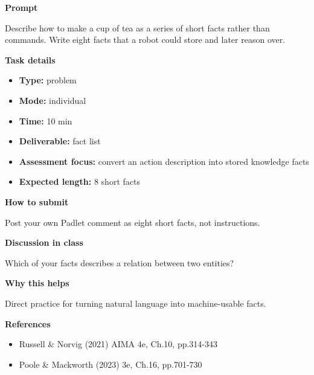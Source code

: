 \documentclass[11pt]{article}
\begin{document}
\begin{tcolorbox}[colback=white,colframe=MidnightBlue,title={Q2 Structured Problem},fonttitle=\bfseries,breakable]
\begin{center}
\end{center}

{\large\bfseries\color{MidnightBlue} Prompt}\par\medskip
Describe how to make a cup of tea as a series of short facts rather than commands. Write eight facts that a robot could store and later reason over.

{\large\bfseries\color{MidnightBlue} Task details}\par\medskip
\begin{itemize}\item \textbf{Type:} problem
\item \textbf{Mode:} individual
\item \textbf{Time:} 10 min
\item \textbf{Deliverable:} fact list
\item \textbf{Assessment focus:} convert an action description into stored knowledge facts
\item \textbf{Expected length:} 8 short facts\end{itemize}

{\large\bfseries\color{MidnightBlue} How to submit}\par\medskip
Post your own Padlet comment as eight short facts, not instructions.

{\large\bfseries\color{MidnightBlue} Discussion in class}\par\medskip
Which of your facts describes a relation between two entities?

{\large\bfseries\color{MidnightBlue} Why this helps}\par\medskip
Direct practice for turning natural language into machine-usable facts.

{\large\bfseries\color{MidnightBlue} References}\par\medskip
\begin{itemize}\item Russell \& Norvig (2021) AIMA 4e, Ch.10, pp.314-343
\item Poole \& Mackworth (2023) 3e, Ch.16, pp.701-730\end{itemize}
\end{tcolorbox}
\end{document}
